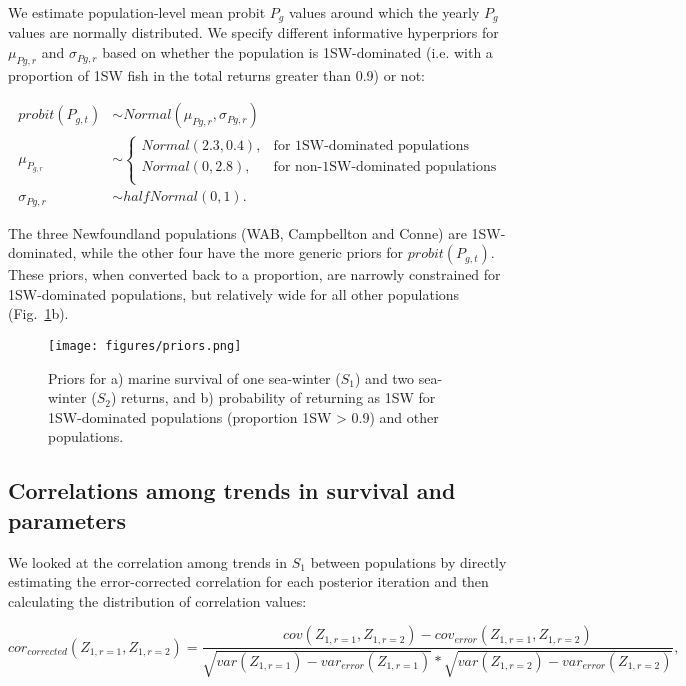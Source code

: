 \documentclass[12pt]{article}
\newcommand{\So}{$S_{1}$\xspace}
\newcommand{\St}{$S_{2}$\xspace}
\newcommand{\Pg}{$P_g$\xspace}
\newcommand{\prmu}{$\mu_{Pg,r}$\xspace}
\newcommand{\prsig}{$\sigma_{Pg,r}$\xspace}
\begin{document}
We estimate population-level mean probit \Pg values around which the yearly \Pg
values are normally distributed. We specify different informative hyperpriors
for \prmu and \prsig based on whether the population is 1SW-dominated (i.e.
with a proportion of 1SW fish in the total returns greater than 0.9) or not:

\begin{align}
    probit(P_{g,t}) &\sim Normal(\mu_{Pg,r}, \sigma_{Pg,r}) \\
    \mu_{P_{g,r}} &\sim
    \begin{cases}
       Normal(2.3, 0.4),  &\text{for 1SW-dominated populations} \\
       Normal(0, 2.8), &\text{for non-1SW-dominated populations} \\
   \end{cases} \\
    \sigma_{Pg,r} &\sim halfNormal(0, 1).
\end{align}

The three Newfoundland populations (WAB, Campbellton and Conne) are
1SW-dominated, while the other four have the more generic priors for $probit(P_{g,t})$.
These priors, when converted back to a proportion, are narrowly constrained
for 1SW-dominated populations, but relatively wide for all other populations
(Fig.~\ref{fig:priors}b).

\begin{figure}[htbp] \centering
    \texttt{[image: figures/priors.png]} \caption{Priors
        for a) marine survival of one sea-winter (\So) and two sea-winter
        (\St) returns, and b) probability of returning as 1SW for
        1SW-dominated populations (proportion 1SW > 0.9) and other populations.}
    \label{fig:priors}
\end{figure}


\subsection*{Correlations among trends in survival and parameters}

We looked at the correlation among trends in \So between populations by
directly estimating the error-corrected correlation for each posterior
iteration and then calculating the distribution of correlation values:

\begin{equation}
cor_{corrected}(Z_{1,r=1},Z_{1,r=2}) = \frac{cov(Z_{1,r=1}, Z_{1,r=2}) - cov_{error}(Z_{1,r=1}, Z_{1,r=2})}
    {\sqrt{var(Z_{1,r=1}) - var_{error}(Z_{1,r=1})}*\sqrt{var(Z_{1,r=2}) - var_{error}(Z_{1,r=2})}}, \label{eq:corz1}
\end{equation}
\end{document}
